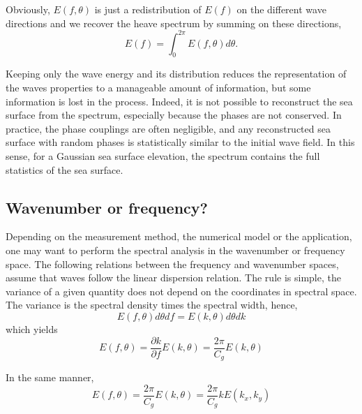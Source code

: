 Obviously, $E(f,\theta)$ is just a redistribution of $E(f)$ on the different wave directions and we recover the heave spectrum by summing on these directions, 
\begin{equation}
E(f) = \int_{0}^{2\pi}  E(f,\theta)d\theta.
\label{eq3.16}
\end{equation}

Keeping only the wave energy and its distribution reduces the   representation of the waves properties to a manageable amount of information, 
but some information is lost in the 
process. Indeed, it is not possible to reconstruct the sea surface from the spectrum, especially because the phases  are not conserved. 
In practice, the phase couplings are often negligible, and any reconstructed sea surface with 
random phases is statistically similar to the initial wave field. In this sense, for a Gaussian sea surface elevation, the spectrum contains 
the full statistics of the sea surface.

 \subsection{Wavenumber or frequency?}
 Depending on the measurement method, the numerical model or the application, one may want to perform the spectral analysis in the wavenumber or
 frequency space. The following relations between the frequency and wavenumber spaces, assume that waves follow the linear
 dispersion relation. The rule is simple, the variance of a given quantity does not depend on the coordinates in spectral space. 
The  variance is the spectral density times the spectral width, hence,
 \begin{equation}
E(f,\theta)d\theta df = E(k,\theta)d\theta dk 
\label{eq:Eftheta_Ektheta1}
\end{equation}
 which yields
 \begin{equation}
E(f,\theta)=\frac{\partial k}{\partial f} E(k,\theta) = \frac{2\pi}{C_g} E(k,\theta)
\label{eq:Eftheta_Ektheta}
\end{equation}

 In the same manner, 
 \begin{equation}
E(f,\theta)= \frac{2\pi}{C_g} E(k,\theta)= \frac{2\pi}{C_g}k E(k_{x},k_{y}) %
\label{eq:Eftheta_Ekxky}
\end{equation}

